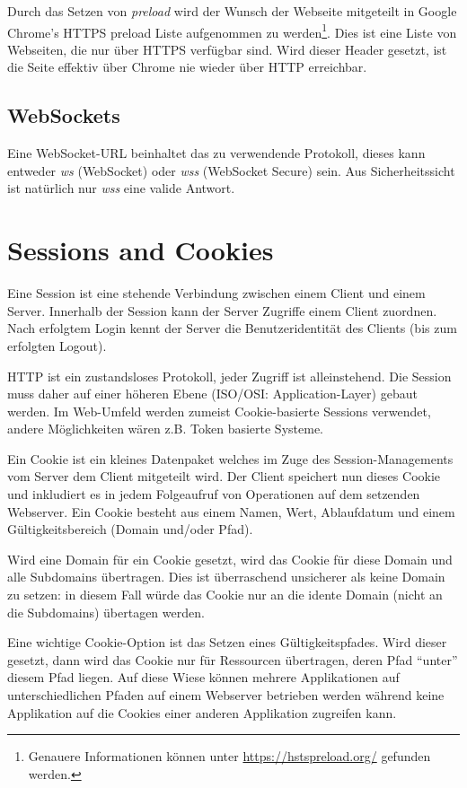 Durch das Setzen von \textit{preload} wird der Wunsch der Webseite mitgeteilt in Google Chrome's HTTPS preload Liste aufgenommen zu werden\footnote{Genauere Informationen können unter \url{https://hstspreload.org/} gefunden werden.}. Dies ist eine Liste von Webseiten, die nur über HTTPS verfügbar sind. Wird dieser Header gesetzt, ist die Seite effektiv über Chrome nie wieder über HTTP erreichbar.

\subsection{WebSockets}

Eine WebSocket-URL beinhaltet das zu verwendende Protokoll, dieses kann entweder \textit{ws} (WebSocket) oder \textit{wss} (WebSocket Secure) sein. Aus Sicherheitssicht ist natürlich nur \textit{wss} eine valide Antwort.

\section{Sessions and Cookies}

Eine Session ist eine stehende Verbindung zwischen einem Client und einem Server. Innerhalb der Session kann der Server Zugriffe einem Client zuordnen. Nach erfolgtem Login kennt der Server die Benutzeridentität des Clients (bis zum erfolgten Logout).

HTTP ist ein zustandsloses Protokoll, jeder Zugriff ist alleinstehend. Die Session muss daher auf einer höheren Ebene (ISO/OSI: Application-Layer) gebaut werden. Im Web-Umfeld werden zumeist Cookie-basierte Sessions verwendet, andere Möglichkeiten wären z.B. Token basierte Systeme.

Ein Cookie ist ein kleines Datenpaket welches im Zuge des Session-Managements vom Server dem Client mitgeteilt wird. Der Client speichert nun dieses Cookie und inkludiert es in jedem Folgeaufruf von Operationen auf dem setzenden Webserver. Ein Cookie besteht aus einem Namen, Wert, Ablaufdatum und einem Gültigkeitsbereich (Domain und/oder Pfad).

Wird eine Domain für ein Cookie gesetzt, wird das Cookie für diese Domain und alle Subdomains übertragen. Dies ist überraschend unsicherer als keine Domain zu setzen: in diesem Fall würde das Cookie nur an die idente Domain (nicht an die Subdomains) übertagen werden.

Eine wichtige Cookie-Option ist das Setzen eines Gültigkeitspfades. Wird dieser gesetzt, dann wird das Cookie nur für Ressourcen übertragen, deren Pfad ``unter'' diesem Pfad liegen. Auf diese Wiese können mehrere Applikationen auf unterschiedlichen Pfaden auf einem Webserver betrieben werden während keine Applikation auf die Cookies einer anderen Applikation zugreifen kann.

